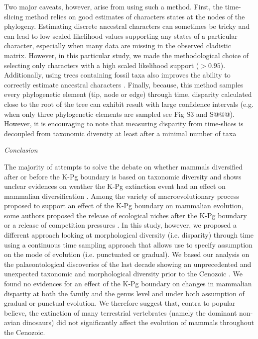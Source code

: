 \documentclass[12pt,letterpaper]{article}
\renewcommand{\subsection}[1]{%
\bigskip
\begin{center}
\begin{large}
\normalfont\itshape #1
\end{large}
\end{center}}
\begin{document}
Two major caveats, however, arise from using such a method.
First, the time-slicing method relies on good estimates of characters states at the nodes of the phylogeny.
Estimating discrete ancestral characters can sometimes be tricky and can lead to low scaled likelihood values supporting any states of a particular character, especially when many data are missing in the observed cladistic matrix.
However, in this particular study, we made the methodological choice of selecting only characters with a high scaled likelihood support ($> 0.95$).
Additionally, using trees containing fossil taxa also improves the ability to correctly estimate ancestral characters \citep{Poly2001,Finarelli2006,Albert2009,Slater2012MEE}.
Finally, because, this method samples every phylogenetic element (tip, node or edge) through time, disparity calculated close to the root of the tree can exhibit result with large confidence intervals (e.g. when only three phylogenetic elements are sampled see Fig S3 and S@@@).
However, it is encouraging to note that measuring disparity from time-slices is decoupled from taxonomic diversity at least after a minimal number of taxa \citep{slaterCetacean,ruta2013,hopkinsdecoupling2013}

\subsection{Conclusion}
The majority of attempts to solve the debate on whether mammals diversified after or before the K-Pg boundary is based on taxonomic diversity and shows unclear evidences on weather the K-Pg extinction event had an effect on mammalian diversification \citep{meredithimpacts2011,O'Leary08022013,dosReis2014,beckancient2014}.
Among the variety of macroevolutionary process proposed to support an effect of the K-Pg boundary on mammalian evolution, some authors proposed the release of ecological niches after the K-Pg boundary \citep[e.g.][]{archibald2011extinction,O'Leary08022013} or a release of competition pressures \citep[e.g.][]{Slater2012MEE,Lovergrove}.
In this study, however, we proposed a different approach looking at morphological diversity (i.e. disparity) through time using a continuous time sampling approach that allows use to specify assumption on the mode of evolution (i.e. punctuated or gradual).
We based our analysis on the palaeontological discoveries of the last decade showing an unprecedented and unexpected taxonomic and morphological diversity prior to the Cenozoic \citep{luo2007,Close2015}.
We found no evidences for an effect of the K-Pg boundary on changes in mammalian disparity at both the family and the genus level and under both assumption of gradual or punctual evolution.
We therefore suggest that, contra to popular believe, the extinction of many terrestrial vertebrates (namely the dominant non-avian dinosaurs) did not significantly affect the evolution of mammals throughout the Cenozoic.
\end{document}
